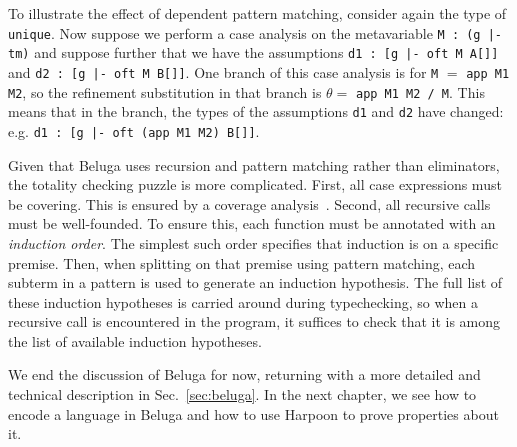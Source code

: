 \begin{sloppypar}
To illustrate the effect of dependent pattern matching, consider again the type
of \lstinline!unique!.
Now suppose we perform a case analysis on the metavariable
\lstinline!M : (g |- tm)! and suppose further that we have the assumptions
\lstinline!d1 : [g |- oft M A[]]! and \lstinline!d2 : [g |- oft M B[]]!.
One branch of this case analysis is for \lstinline!M! $=$ \lstinline!app M1 M2!,
so the refinement substitution in that branch is $\theta = $ \lstinline!app M1 M2 / M!.
This means that in the branch, the types of the assumptions \lstinline!d1! and
\lstinline!d2! have changed: e.g. \lstinline!d1 : [g |- oft (app M1 M2) B[]]!.
\end{sloppypar}

Given that Beluga uses recursion and pattern matching rather than eliminators,
the totality checking puzzle is more complicated.
First, all case expressions must be covering.
This is ensured by a coverage analysis~\cite{Pientka:TLCA15}.
Second, all recursive calls must be well-founded.
To ensure this, each function must be annotated with an \emph{induction order}.
The simplest such order specifies that induction is on a specific premise.
Then, when splitting on that premise using pattern matching, each subterm in a
pattern is used to generate an induction hypothesis.
The full list of these induction hypotheses is carried around during
typechecking, so when a recursive call is encountered in the program, it
suffices to check that it is among the list of available induction hypotheses.

We end the discussion of Beluga for now, returning with a more detailed and
technical description in Sec.~\ref{sec:beluga}.
In the next chapter, we see how to encode a language in Beluga and how to use
Harpoon to prove properties about it.

%
